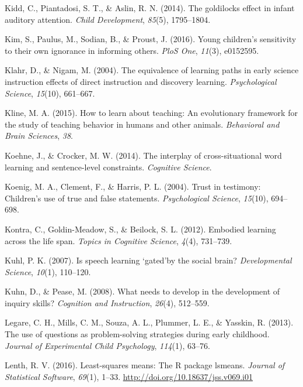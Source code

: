 \documentclass[oneside]{report}
\begin{document}
\hypertarget{ref-kidd2014goldilocks}{}
Kidd, C., Piantadosi, S. T., \& Aslin, R. N. (2014). The goldilocks
effect in infant auditory attention. \emph{Child Development},
\emph{85}(5), 1795--1804.

\hypertarget{ref-kim2016young}{}
Kim, S., Paulus, M., Sodian, B., \& Proust, J. (2016). Young children's
sensitivity to their own ignorance in informing others. \emph{PloS One},
\emph{11}(3), e0152595.

\hypertarget{ref-klahr2004equivalence}{}
Klahr, D., \& Nigam, M. (2004). The equivalence of learning paths in
early science instruction effects of direct instruction and discovery
learning. \emph{Psychological Science}, \emph{15}(10), 661--667.

\hypertarget{ref-kline2015learn}{}
Kline, M. A. (2015). How to learn about teaching: An evolutionary
framework for the study of teaching behavior in humans and other
animals. \emph{Behavioral and Brain Sciences}, \emph{38}.

\hypertarget{ref-koehne2014interplay}{}
Koehne, J., \& Crocker, M. W. (2014). The interplay of cross-situational
word learning and sentence-level constraints. \emph{Cognitive Science}.

\hypertarget{ref-koenig2004trust}{}
Koenig, M. A., Clement, F., \& Harris, P. L. (2004). Trust in testimony:
Children's use of true and false statements. \emph{Psychological
Science}, \emph{15}(10), 694--698.

\hypertarget{ref-kontra2012embodied}{}
Kontra, C., Goldin-Meadow, S., \& Beilock, S. L. (2012). Embodied
learning across the life span. \emph{Topics in Cognitive Science},
\emph{4}(4), 731--739.

\hypertarget{ref-kuhl2007speech}{}
Kuhl, P. K. (2007). Is speech learning `gated'by the social brain?
\emph{Developmental Science}, \emph{10}(1), 110--120.

\hypertarget{ref-kuhn2008needs}{}
Kuhn, D., \& Pease, M. (2008). What needs to develop in the development
of inquiry skills? \emph{Cognition and Instruction}, \emph{26}(4),
512--559.

\hypertarget{ref-legare2013use}{}
Legare, C. H., Mills, C. M., Souza, A. L., Plummer, L. E., \& Yasskin,
R. (2013). The use of questions as problem-solving strategies during
early childhood. \emph{Journal of Experimental Child Psychology},
\emph{114}(1), 63--76.

\hypertarget{ref-lenth2016lsmeans}{}
Lenth, R. V. (2016). Least-squares means: The R package lsmeans.
\emph{Journal of Statistical Software}, \emph{69}(1), 1--33.
\url{http://doi.org/10.18637/jss.v069.i01}
\end{document}

